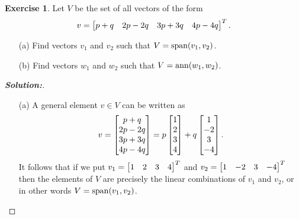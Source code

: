 \documentclass[a4paper]{amsart}
\theoremstyle{definition}
\newtheorem{exercise}{Exercise}
\newenvironment{solution}{\begin{proof}[\textbf{Solution:}] \vphantom{u}}{\end{proof}}
\begin{document}
\begin{exercise}\label{ex-span-canonical-ii}
 Let $V$ be the set of all vectors of the form 
 \[ v = \left[\begin{matrix} p+q & 2p-2q & 3p+3q & 4p-4q \end{matrix}\right]^T. \]
 \begin{itemize}
  \item[(a)] Find vectors $v_1$ and $v_2$ such that
   $V=\operatorname{span}(v_1,v_2)$. 
  \item[(b)] Find vectors $w_1$ and $w_2$ such that
   $V=\operatorname{ann}(w_1,w_2)$. 
 \end{itemize}
\end{exercise}
\begin{solution}
 \begin{itemize}
  \item[(a)] A general element $v\in V$ can be written as
   \[ v = \left[\begin{matrix} p+q \\ 2p-2q \\ 3p+3q \\ 4p-4q \end{matrix}\right]
        = p \left[\begin{matrix} 1\\2\\3\\4 \end{matrix}\right] + q \left[\begin{matrix} 1\\-2\\3\\-4\end{matrix}\right]. 
   \]
   It follows that if we put $v_1=\left[\begin{matrix} 1&2&3&4\end{matrix}\right]^T$ and
   $v_2=\left[\begin{matrix} 1&-2&3&-4\end{matrix}\right]^T$ then the elements of $V$ are precisely
   the linear combinations of $v_1$ and $v_2$, or in other words
   $V=\operatorname{span}(v_1,v_2)$.  


\end{itemize}
\end{solution}
\end{document}
